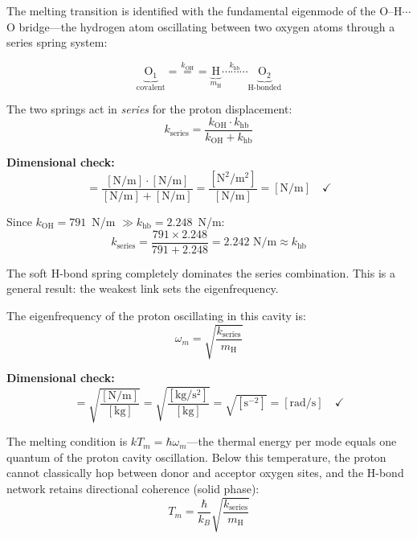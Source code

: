 The melting transition is identified with the fundamental eigenmode of the 
O--H$\cdots$O bridge---the hydrogen atom oscillating between two oxygen atoms 
through a series spring system:

\begin{equation}
  \underbrace{\text{O}_1}_{\text{covalent}} 
  \overset{k_\text{OH}}{=\!=\!=} 
  \underbrace{\text{H}}_{{m_\text{H}}} 
  \overset{k_\text{hb}}{\cdots\cdots\cdots} 
  \underbrace{\text{O}_2}_{\text{H-bonded}}
  \label{eq:bridge_diagram}
\end{equation}

The two springs act in \emph{series} for the proton displacement:
\begin{equation}
  k_\text{series} = \frac{k_\text{OH} \cdot k_\text{hb}}{k_\text{OH} + k_\text{hb}}
  \label{eq:k_series}
\end{equation}

\noindent\textbf{Dimensional check:}
\begin{equation}
  [k_\text{series}] = \frac{[\text{N/m}] \cdot [\text{N/m}]}{[\text{N/m}] + [\text{N/m}]} 
  = \frac{[\text{N}^2/\text{m}^2]}{[\text{N/m}]} 
  = [\text{N/m}] \quad\checkmark
\end{equation}

Since $k_\text{OH} = 791$~N/m $\gg k_\text{hb} = 2.248$~N/m:
\begin{equation}
  k_\text{series} = \frac{791 \times 2.248}{791 + 2.248} = 2.242 \text{ N/m} \approx k_\text{hb}
\end{equation}

The soft H-bond spring completely dominates the series combination. This is a 
general result: the weakest link sets the eigenfrequency.

The eigenfrequency of the proton oscillating in this cavity is:
\begin{equation}
  \omega_m = \sqrt{\frac{k_\text{series}}{m_\text{H}}}
  \label{eq:omega_m}
\end{equation}

\noindent\textbf{Dimensional check:}
\begin{equation}
  [\omega_m] = \sqrt{\frac{[\text{N/m}]}{[\text{kg}]}} 
  = \sqrt{\frac{[\text{kg}/\text{s}^2]}{[\text{kg}]}} 
  = \sqrt{[\text{s}^{-2}]} = [\text{rad/s}] \quad\checkmark
\end{equation}

The melting condition is $kT_m = \hbar\omega_m$---the thermal energy per mode 
equals one quantum of the proton cavity oscillation. Below this temperature, 
the proton cannot classically hop between donor and acceptor oxygen sites, 
and the H-bond network retains directional coherence (solid phase):
\begin{equation}
  \boxed{T_m = \frac{\hbar}{k_B} \sqrt{\frac{k_\text{series}}{m_\text{H}}}}
  \label{eq:Tm_eigenmode}
\end{equation}

